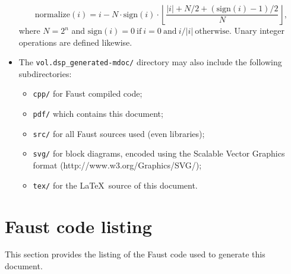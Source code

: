 \documentclass{article}
\newcommand{\faustdocdir}{vol.dsp_generated-mdoc}
\begin{document}
\begin{itemize}
$$\mathrm{normalize}(i) = i - N\cdot\mathrm{sign}(i) \cdot \left\lfloor \frac{|i|+N/2+(\mathrm{sign}(i)\!-\!1)/2}{N} \right\rfloor , $$
 where $N = 2^n$ and $\mathrm{sign}(i) = 0 \mathrm{\ if\ } i=0 \mathrm{\ and\ } i / |i| \mathrm{\ otherwise}.$
Unary integer operations are defined likewise.
	\item The \texttt{\faustdocdir/} directory may also include the following subdirectories:
\begin{itemize}
	\item	\texttt{cpp/} for Faust compiled code; 
	\item	\texttt{pdf/} which contains this document; 
	\item	\texttt{src/} for all Faust sources used (even libraries); 
	\item	\texttt{svg/} for block diagrams, encoded using the Scalable Vector Graphics format (\textsf{http://www.w3.org/Graphics/SVG/});
	\item	\texttt{tex/} for the \LaTeX\ source of this document.
\end{itemize}
\end{itemize}


\section{Faust code listing}
\label{listing}

This section provides the listing of the Faust code used to generate this document.
\end{document}
